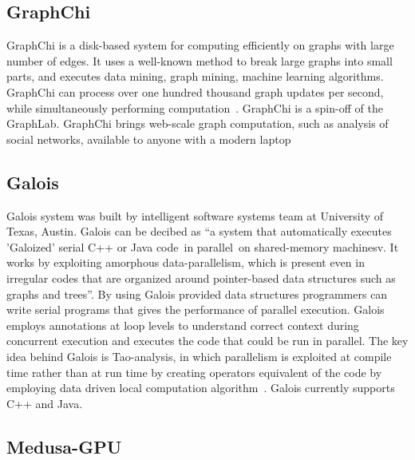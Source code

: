 \subsection{GraphChi}

GraphChi is a disk-based system for computing efficiently on graphs
with large number of edges.  It uses a well-known method to break
large graphs into small parts, and executes data mining, graph mining,
machine learning algorithms. GraphChi can process over one hundred
thousand graph updates per second, while simultaneously performing
computation~\cite{GraphChi}. GraphChi is a spin-off of the
GraphLab. GraphChi brings web-scale graph computation, such as
analysis of social networks, available to anyone with a modern laptop

     
\subsection{Galois}
     
Galois system was built by intelligent software systems team at
University of Texas, Austin. Galois can be decibed as ``a system that
automatically executes 'Galoized' serial C++ or Java code in
parallel on shared-memory machinesv\cite{www-galoisSite}. It works by
exploiting amorphous data-parallelism, which is present even in
irregular codes that are organized around pointer-based data
structures such as graphs and trees''. By using Galois provided data
structures programmers can write serial programs that gives the
performance of parallel execution. Galois employs annotations at loop
levels to understand correct context during concurrent execution and
executes the code that could be run in parallel. The key idea behind
Galois is Tao-analysis, in which parallelism is exploited at compile
time rather than at run time by creating operators equivalent of the
code by employing data driven local computation
algorithm~\cite{taoParallelismPaper}. Galois currently supports C++
and Java.

     \pv
	   
\subsection{Medusa-GPU}
     

